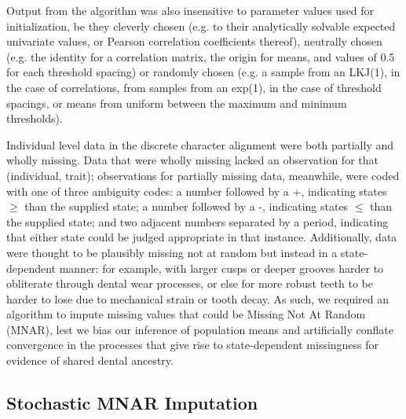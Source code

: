 Output from the algorithm was also insensitive to parameter values used for initialization, be they cleverly chosen (e.g. to their analytically solvable expected univariate values, or Pearson correlation coefficients thereof), neutrally chosen (e.g. the identity for a correlation matrix, the origin for means, and values of 0.5 for each threshold spacing) or randomly chosen (e.g. a sample from an LKJ(1), in the case of correlations, from samples from an exp(1), in the case of threshold spacings, or means from uniform between the maximum and minimum thresholds). 

Individual level data in the discrete character alignment were both partially and wholly missing. Data that were wholly missing lacked an observation for that (individual, trait); observations for partially missing data, meanwhile, were coded with one of three ambiguity codes: a number followed by a +, indicating states $\geq$ than the supplied state; a number followed by a -, indicating states $\leq$ than the supplied state; and two adjacent numbers separated by a period, indicating that either state could be judged appropriate in that instance. Additionally, data were thought to be plausibly missing not at random but instead in a state-dependent manner: for example, with larger cusps or deeper grooves harder to obliterate through dental wear processes, or else for more robust teeth to be harder to lose due to mechanical strain or tooth decay. As such, we required an algorithm to impute missing values that could be Missing Not At Random (MNAR), lest we bias our inference of population means and artificially conflate convergence in the processes that give rise to state-dependent missingness for evidence of shared dental ancestry.

\subsection{Stochastic MNAR Imputation}

